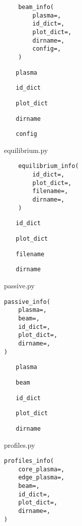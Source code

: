 \documentclass[../main.tex]{subfiles}
\begin{document}
\begin{verbatim}
    beam_info(
        plasma=,
        id_dict=,
        plot_dict=,
        dirname=,
        config=,
    )
\end{verbatim}

\begin{itemize}[align=left]
    \item[\texttt{plasma}]
    \item[\texttt{id\_dict}]
    \item[\texttt{plot\_dict}]
    \item[\texttt{dirname}]
    \item[\texttt{config}]
\end{itemize}

equilibrium.py

\begin{verbatim}
    equilibrium_info(
        id_dict=,
        plot_dict=,
        filename=,
        dirname=,
    )
\end{verbatim}

\begin{itemize}[align=left]
    \item[\texttt{id\_dict}]
    \item[\texttt{plot\_dict}]
    \item[\texttt{filename}]
    \item[\texttt{dirname}]
\end{itemize}

passive.py

\begin{verbatim}
passive_info(
    plasma=,
    beam=,
    id_dict=,
    plot_dict=,
    dirname=,
)
\end{verbatim}

\begin{itemize}[align=left]
    \item[\texttt{plasma}]
    \item[\texttt{beam}]
    \item[\texttt{id\_dict}]
    \item[\texttt{plot\_dict}]
    \item[\texttt{dirname}]
\end{itemize}

profiles.py

\begin{verbatim}
profiles_info(
    core_plasma=,
    edge_plasma=,
    beam=,
    id_dict=,
    plot_dict=,
    dirname=,
)
\end{verbatim}
\end{document}
